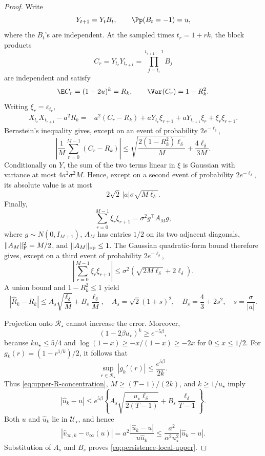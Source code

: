 \begin{proof}
Write
\[
 Y_{t+1}=Y_tB_t,
 \qquad
 \Pp(B_t=-1)=u,
\]
where the \(B_t\)'s are independent.  At the sampled times
\(t_r=1+rk\), the block products
\[
 C_r=Y_{t_r}Y_{t_{r+1}}
 =\prod_{j=t_r}^{t_{r+1}-1}B_j
\]
are independent and satisfy
\[
 \E C_r=(1-2u)^k=R_k,
 \qquad
 \Var(C_r)=1-R_k^2.
\]
Writing \(\xi_r=\varepsilon_{t_r}\),
\begin{align*}
 X_{t_r}X_{t_{r+1}}-a^2R_k
 ={}&a^2(C_r-R_k)
 +aY_{t_r}\xi_{r+1}
 +aY_{t_{r+1}}\xi_r
 +\xi_r\xi_{r+1}.
\end{align*}
Bernstein's inequality gives, except on an event of probability
\(2e^{-\ell_\delta}\),
\[
 \left|\frac1M\sum_{r=0}^{M-1}(C_r-R_k)\right|
 \leq
 \sqrt{\frac{2(1-R_k^2)\ell_\delta}{M}}
 +\frac{4\ell_\delta}{3M}.
\]
Conditionally on \(Y\), the sum of the two terms linear in \(\xi\) is
Gaussian with variance at most \(4a^2\sigma^2M\).  Hence, except on a
second event of probability \(2e^{-\ell_\delta}\), its absolute value is at
most
\[
 2\sqrt2\,|a|\sigma\sqrt{M\ell_\delta}.
\]
Finally,
\[
 \sum_{r=0}^{M-1}\xi_r\xi_{r+1}
 =\sigma^2g^\top A_Mg,
\]
where \(g\sim N(0,I_{M+1})\), \(A_M\) has entries \(1/2\) on its two
adjacent diagonals,
\(\|A_M\|_{\rm F}^2=M/2\), and
\(\|A_M\|_{\rm op}\leq1\).  The Gaussian quadratic-form bound therefore
gives, except on a third event of probability \(2e^{-\ell_\delta}\),
\[
 \left|\sum_{r=0}^{M-1}\xi_r\xi_{r+1}\right|
 \leq\sigma^2
 \left(\sqrt{2M\ell_\delta}+2\ell_\delta\right).
\]
A union bound and \(1-R_k^2\leq1\) yield
\begin{equation}
 |\widehat R_k-R_k|
 \leq
 A_s\sqrt{\frac{\ell_\delta}{M}}
 +B_s\frac{\ell_\delta}{M},
 \quad
 A_s=\sqrt2(1+s)^2,
 \quad
 B_s=\frac43+2s^2,
 \quad s=\frac\sigma{|a|}.
 \label{eq:upper-R-concentration}
\end{equation}

Projection onto \(\mathcal R_\star\) cannot increase the error.  Moreover,
\[
 (1-2\beta u_\star)^k\geq e^{-5\beta},
\]
because \(ku_\star\leq5/4\) and
\(\log(1-x)\geq-x/(1-x)\geq-2x\) for \(0\leq x\leq1/2\).
For \(g_k(r)=(1-r^{1/k})/2\), it follows that
\[
 \sup_{r\in\mathcal R_\star}|g_k'(r)|
 \leq\frac{e^{5\beta}}{2k}.
\]
Thus \eqref{eq:upper-R-concentration},
\(M\geq(T-1)/(2k)\), and \(k\geq1/u_\star\) imply
\begin{equation}
 |\widehat u_k-u|
 \leq e^{5\beta}
 \left\{
 A_s\sqrt{\frac{u_\star\ell_\delta}{2(T-1)}}
 +B_s\frac{\ell_\delta}{T-1}
 \right\}.
 \label{eq:upper-u-concentration}
\end{equation}
Both \(u\) and \(\widehat u_k\) lie in \(\mathcal U_\star\), and hence
\[
 |\widehat v_{\infty,k}-v_\infty(u)|
 =a^2\frac{|\widehat u_k-u|}{u\widehat u_k}
 \leq\frac{a^2}{\alpha^2u_\star^2}|\widehat u_k-u|.
\]
Substitution of \(A_s\) and \(B_s\) proves
\eqref{eq:persistence-local-upper}.
\end{proof}

